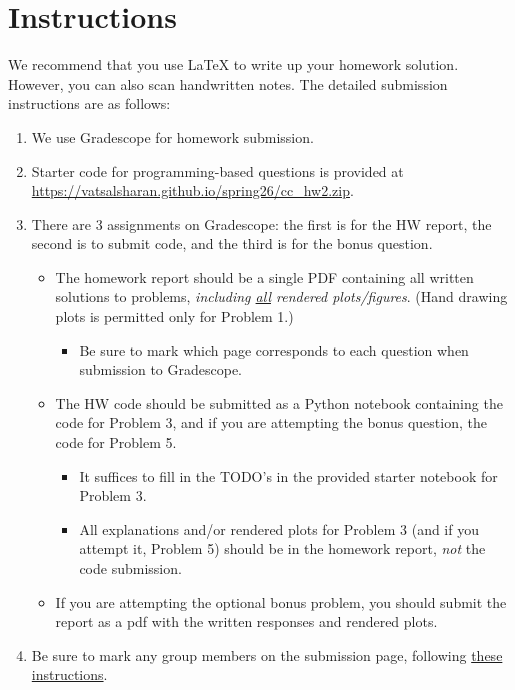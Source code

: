 \documentclass{article}
\newcommand{\pink}[1]{{\color{magenta}#1}}
\begin{document}
\section*{Instructions}
We recommend that you use LaTeX to write up your homework solution. However, you can also scan handwritten notes. The detailed submission instructions are as follows:
\begin{enumerate}
    \item We use Gradescope for homework submission.
    \item Starter code for programming-based questions is provided at \url{https://vatsalsharan.github.io/spring26/cc_hw2.zip}.
    \item There are 3 assignments on Gradescope: the first is for the HW report, the second is to submit code, and the third is for the bonus question.
    \begin{itemize}
        \item The homework report should be a single PDF containing all written solutions to problems, \emph{including \underline{all} rendered plots/figures}. (Hand drawing plots is permitted only for Problem 1.)
        \begin{itemize}
            \item Be sure to mark which page corresponds to each question when submission to Gradescope.
        \end{itemize}
        \item The HW code should be submitted as a Python notebook containing the code for Problem 3, and if you are attempting the bonus question, the code for Problem 5.
        \begin{itemize}
            \item It suffices to fill in the TODO's in the provided starter notebook for Problem 3.
            \item All explanations and/or rendered plots for Problem 3  (and if you attempt it, Problem 5) should be in the homework report, \emph{not} the code submission.
        \end{itemize}
        \item If you are attempting the optional bonus problem, you should submit the report as a pdf with  the written responses and rendered plots.
    \end{itemize}
\item Be sure to mark any group members on the submission page, following \href{https://guides.gradescope.com/hc/en-us/articles/21863861823373-Adding-Group-Members-to-a-Submission}{\pink{these instructions}}.
\end{enumerate}
\end{document}

